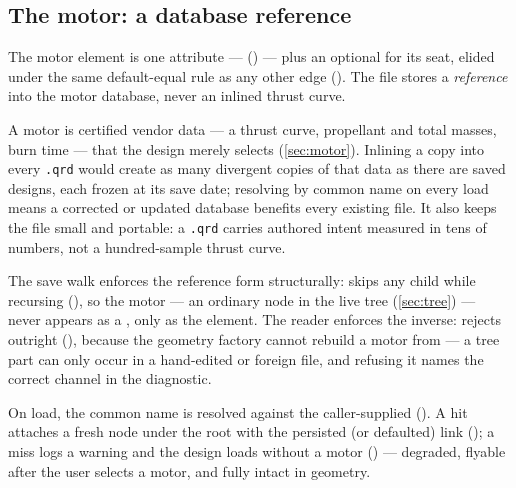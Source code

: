 \subsection{The motor: a database reference}\label{sec:serialization-motor}

The motor element is one attribute --- 
() --- plus an optional  for its
seat, elided under the same default-equal rule as any other edge
(). The file stores a \emph{reference} into the
motor database, never an inlined thrust curve.

\begin{designrule}
A motor is certified vendor data --- a thrust curve, propellant and total masses, burn
time --- that the design merely selects (\cref{sec:motor}). Inlining a copy into every
\texttt{.qrd} would create as many divergent copies of that data as there are saved
designs, each frozen at its save date; resolving by common name on every load means a
corrected or updated database benefits every existing file. It also keeps the file small
and portable: a \texttt{.qrd} carries authored intent measured in tens of numbers, not a
hundred-sample thrust curve.
\end{designrule}

The save walk enforces the reference form structurally:  skips any
 child while recursing (), so the
motor --- an ordinary node in the live tree (\cref{sec:tree}) --- never appears as a
, only as the  element. The reader enforces the inverse:
 rejects  outright
(), because the geometry factory cannot rebuild
a motor from  --- a  tree part can only occur in a hand-edited
or foreign file, and refusing it names the correct channel in the diagnostic.

On load, the common name is resolved against the caller-supplied
 (). A hit attaches a
fresh  node under the root with the persisted (or defaulted) link
(); a miss logs a warning and the design loads
without a motor () --- degraded, flyable after
the user selects a motor, and fully intact in geometry.

